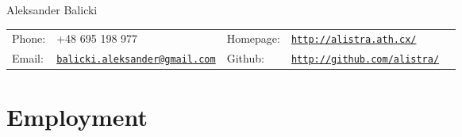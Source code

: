 \documentclass[letterpaper]{article}
\def\name{Aleksander Balicki}
\begin{document}
\centerline{\huge \name}
\vspace{0.25in}

\begin{tabularx}{\textwidth}{lXlll}
        Phone: 	& +48 695 198 977 & Homepage: & \href{http://alistra.ath.cx/}{\tt http://alistra.ath.cx/} \\
        Email: 	& \href{mailto:balicki.aleksander@gmail.com}{\tt balicki.aleksander@gmail.com}
        & Github: & \href{http://github.com/alistra/}{\tt http://github.com/alistra/}\\
    \end{tabularx}

\section*{Employment}
\end{document}
